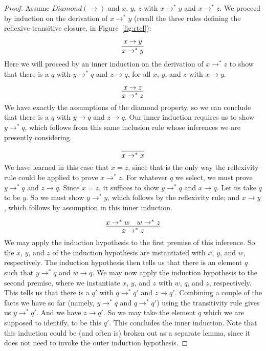 \begin{proof}
  Assume $\textit{Diamond}(\to)$ and $x$, $y$, $z$ with $x \to^*y$ and $x \to^* z$.  We proceed
  by induction on the derivation of $x \to^* y$ (recall the three rules defining the reflexive-transitive
  closure, in Figure~\ref{fig:rtcl}):

  \case{ }
  \[
  \infer{x \to^* y}{x \to y}
  \]
  \noindent Here we will proceed by an inner induction on the derivation of $x \to^* z$ to show that there
  is a $q$ with $y\to^*q$ and $z \to q$, for all $x$, $y$, and $z$ with $x\to y$.

  \[
  \infer{x \to^* z}{x \to z}
  \]
  \noindent We have exactly the assumptions of the diamond property, so we can conclude that there is a $q$
  with $y \to q$ and $z \to q$.  Our inner induction requires us to show $y \to^* q$, which follows from
  this same inclusion rule whose inferences we are presently considering.

  \[
  \infer{x \to^* x}{\ }
  \]
  \noindent We have learned in this case that $x = z$, since that is the only way the reflexivity
  rule could be applied to prove $x \to^*z$.  
  For whatever $q$ we select, we must prove $y \to^*q$ and $z \to q$.  
  Since $x = z$, it suffices to show $y \to^*q$ and $x \to q$.  Let us take $q$ to be $y$.
  So we must show $y \to^* y$, which follows by the reflexivity rule; and $x \to y$, which
  follows by assumption in this inner induction.

  \[
  \infer{x \to^* z}{x \to^*w & w \to^* z}
  \]
  \noindent We may apply the induction hypothesis to the first premise of this
  inference.  So the $x$, $y$, and $z$ of the induction hypothesis are instantiated
  with $x$, $y$, and $w$, respectively.  The induction hypothesis then tells us that
  there is an element $q$ such that $y \to^*q$ and $w \to q$.  We may now apply the
  induction hypothesis to the second premise, where we
  instantiate $x$, $y$, and $z$ with $w$, $q$, and $z$, respectively.  This tells
  us that there is a $q'$ with $q\to^*q'$ and $z \to q'$.  Combining a couple of
  the facts we have so far (namely, $y\to^* q$ and $q\to^* q'$) using the
  transitivity rule gives us $y \to^* q'$.  And we have $z \to q'$.
  So we may take the element $q$ which we are supposed to identify, to be this $q'$.
  This concludes the inner induction.  Note that this induction could be (and often is)
  broken out as a separate lemma, since it does not need to invoke the outer induction
  hypothesis.
  

\end{proof}
